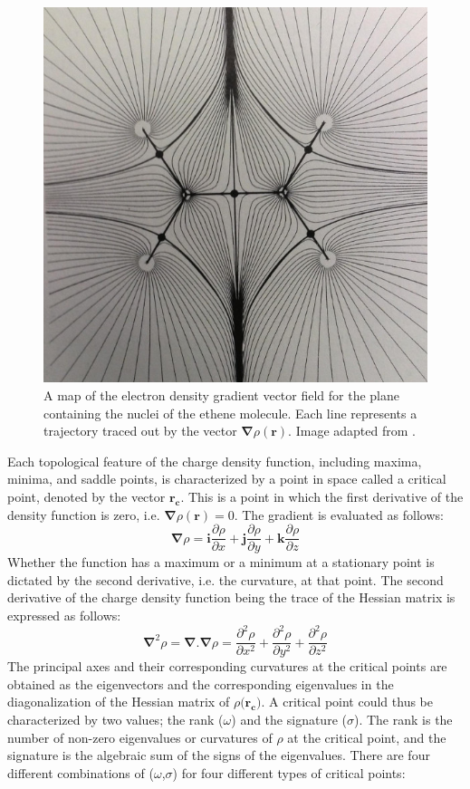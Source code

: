 \documentclass[11pt]{report}
\begin{document}
\begin{figure}
  \centering
  \includegraphics[width=0.55\linewidth]{images/aim.jpg}
  \caption[A map of the electron density gradient vector field]{A map of the electron density gradient vector 
  	field for the plane containing
  the nuclei of the ethene molecule.
  Each line represents a trajectory traced out by
  the vector $\mathbf{\nabla}\rho(\mathbf{r})$. Image adapted from
  \cite{aimplot}.}
  \label{f:Intro-aim}
\end{figure}

Each topological feature of the charge density function,
including maxima, minima, and saddle points, is characterized by a point
in space called a critical point, denoted by the vector $\mathbf{r_c}$. This is a point in which the first
derivative of the density function is zero, i.e. $\mathbf{\nabla} \rho(\mathbf{r})=0$.
The gradient is evaluated as follows:
\begin{equation}
\mathbf{\nabla} \rho = \mathbf{i} \frac{\partial \rho}{\partial x} + 
\mathbf{j} \frac{\partial \rho}{\partial y} + 
\mathbf{k} \frac{\partial \rho}{\partial z}
\end{equation}
Whether the function has a maximum or a minimum at a stationary point is
dictated by the second derivative, i.e. the curvature, at that point. 
The second derivative of the charge density function 
being the trace of the Hessian matrix
is expressed as follows:
\begin{equation}
\mathbf{\nabla}^2 \rho = \mathbf{\nabla}. \mathbf{\nabla} \rho = 
 \frac{\partial^2 \rho}{\partial x^2} + 
\frac{\partial^2 \rho}{\partial y^2} + 
 \frac{\partial^2 \rho}{\partial z^2}
\end{equation}
The principal axes and their corresponding curvatures at the critical points
are obtained as the eigenvectors and the corresponding eigenvalues in the 
diagonalization of the Hessian matrix of $\rho(\mathbf{r_c)}$.
A critical point could thus be characterized by two values; the rank ($\omega$)
and the signature ($\sigma$). The rank is the number of non-zero eigenvalues
or curvatures of $\rho$ at the critical point, and the
signature is the algebraic sum of the signs of the eigenvalues.
There are four different combinations of ($\omega$,$\sigma$) for
four different types of critical points:
\end{document}
